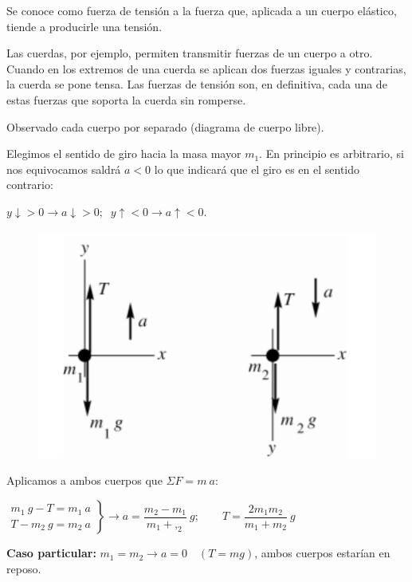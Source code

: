 \vspace{6mm} %
\small{\textsf{Se conoce como fuerza de tensión a la fuerza que, aplicada a un cuerpo elástico, tiende a producirle una tensión.}}

\small{\textsf{Las cuerdas, por ejemplo, permiten transmitir fuerzas de un cuerpo a otro. Cuando en los extremos de una cuerda se aplican dos fuerzas iguales y contrarias, la cuerda se pone tensa. Las fuerzas de tensión son, en definitiva, cada una de estas fuerzas que soporta la cuerda sin romperse}}\normalsize{.}

\begin{multicols}{2}
Observado cada cuerpo por separado (diagrama de cuerpo libre).

Elegimos el sentido de giro hacia la masa mayor $m_1$. En principio es arbitrario, si nos equivocamos saldrá $a<0$ lo que indicará que el giro es en el sentido contrario:

\noindent \small{$y \downarrow >0 \to a \downarrow > 0;\; \; y \uparrow < 0 \to a \uparrow < 0$}\normalsize{.}
\begin{figure}[H]
	\centering
	\includegraphics[width=.4\textwidth]{imagenes/imagenes03/T03IM34.png}
	\end{figure}
\end{multicols}

\vspace{20mm} %
Aplicamos a ambos cuerpos que $\Sigma F=m \ a$:

$\left.
\begin{matrix} 
 m_1 \ g -T =m_1 \ a \\ T - m_2 \ g =m_2 \ a	
\end{matrix}
\right\} \displaystyle \to a=\dfrac{m_2 - m_1}{m_1+,_2} \ g;  \qquad T=\dfrac {2m_1m_2}{m_1+m_2}\ g $

\vspace{6mm} \textbf{Caso particular:} $m_1=m_2 \to a=0 \quad (T=mg)$, ambos cuerpos estarían en reposo.

